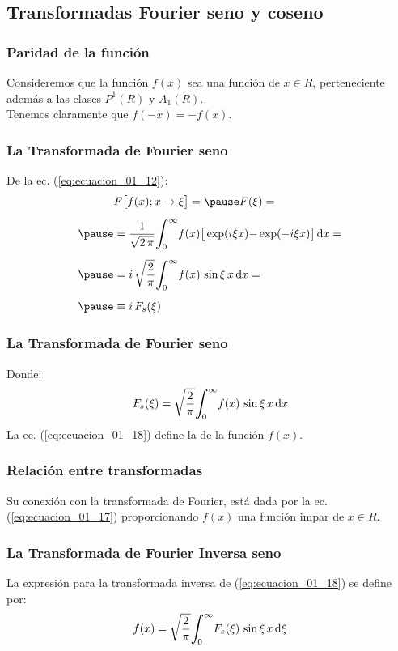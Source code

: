 \subsection{Transformadas Fourier seno y coseno}

\begin{frame}
\frametitle{Paridad de la función}
Consideremos que la función $f (x)$ sea una función  de $x \in R$, perteneciente además a las clases $P^{1} (R)$ y $A_{1} (R)$.
\\
\bigskip
\pause
Tenemos claramente que $f (-x) = - f (x)$. 
\end{frame}
\begin{frame}
\frametitle{La Transformada de Fourier seno}
De la ec. (\ref{eq:ecuacion_01_12}):
\pause
\begin{eqnarray}
\begin{aligned}[b]
&F \big[ f (x); x \to \xi \big] = \pause F (\xi) = \\[0.5em] \pause
&= \dfrac{1}{\sqrt{2 \, \pi}} \scaleint{6ex}_{\bs 0}^{\infty} f (x) \big[ \exp(i \xi x) {-} \exp(-i \xi x) \big] \dd{x} = \\[0.5em] \pause
&= i \, \sqrt{\dfrac{2}{\pi}} \scaleint{6ex}_{\bs 0}^{\infty} f (x) \, \sin \xi \, x \dd{x} = \\[0.5em] \pause
&\equiv i \, F_{s} (\xi)
\end{aligned}
\label{eq:ecuacion_01_17}
\end{eqnarray}
\end{frame}
\begin{frame}
\frametitle{La Transformada de Fourier seno}
Donde:
\pause
\begin{align}
F_{s} (\xi) = \sqrt{\dfrac{2}{\pi}} \scaleint{6ex}_{\bs 0}^{\infty} f (x) \, \sin \xi \, x \dd{x}
\label{eq:ecuacion_01_18}
\end{align}
La ec. (\ref{eq:ecuacion_01_18}) define la  de la función $f (x)$.
\end{frame}
\begin{frame}
\frametitle{Relación entre transformadas}
Su conexión con la transformada de Fourier, está dada por la ec. (\ref{eq:ecuacion_01_17}) proporcionando $f (x)$ una función impar de $x \in R$.
\end{frame}
\begin{frame}
\frametitle{La Transformada de Fourier Inversa seno}
La expresión para la transformada inversa de (\ref{eq:ecuacion_01_18}) se define por:
\pause
\begin{align}
f (x) = \sqrt{\dfrac{2}{\pi}} \scaleint{6ex}_{\bs 0}^{\infty} F_{s}(\xi) \, \sin \xi \, x \dd{\xi}
\label{eq:ecuacion_01_19}
\end{align}
\end{frame}
